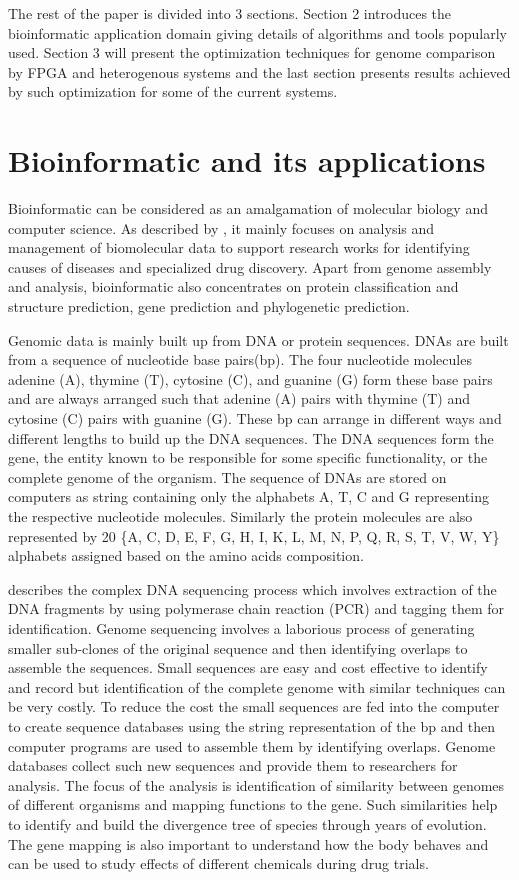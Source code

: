 \documentclass[12pt,twoside]{article}
\begin{document}
The rest of the paper is divided into 3 sections. Section 2 introduces the bioinformatic application domain giving
details of algorithms and tools popularly used. Section 3 will present the optimization techniques for genome
comparison by FPGA and heterogenous systems and the last section presents results achieved by such optimization
for some of the current systems.

\section {Bioinformatic and its applications}
\label{sec:bioapplications}
Bioinformatic can be considered as an amalgamation of molecular biology and computer science.
As described by \textcite[chapter 8]{gokhale_reconfigurable_2010}, it mainly focuses on analysis
and management of biomolecular data to support research works for identifying causes of diseases and
specialized drug discovery. Apart from genome assembly and analysis, bioinformatic also concentrates
on protein classification and structure prediction, gene prediction and phylogenetic prediction.

Genomic data is mainly built up from DNA or protein sequences. DNAs are built from a sequence of
nucleotide base pairs(bp). The four nucleotide molecules adenine (A), thymine (T), cytosine (C), and guanine (G)
form these base pairs and are always arranged such that adenine (A) pairs with thymine (T) and
cytosine (C) pairs with guanine (G). These bp can arrange in different ways and different lengths to build up the DNA
sequences. The DNA sequences form the gene, the entity known to be responsible for some specific functionality,
or the complete genome of the organism. The sequence of DNAs are stored on computers as string containing only the
alphabets A, T, C and G representing the respective nucleotide molecules. Similarly the protein molecules
are also represented by 20 \{A, C, D, E, F, G, H, I, K, L, M, N, P, Q, R, S, T, V, W, Y\} alphabets assigned
based on the amino acids composition.

\textcite[chapter 2]{mount_bioinformatics:_2004} describes the complex DNA sequencing process which involves
extraction of the DNA fragments by using polymerase chain reaction (PCR) and tagging them for identification.
Genome sequencing involves a laborious process of generating smaller sub-clones of the original sequence and
then identifying overlaps to assemble the sequences. Small sequences are easy and cost effective to identify
and record but identification of the complete genome with similar techniques can be very costly. To reduce
the cost the small sequences are fed into the computer to create sequence databases using the string
representation of the bp and then computer programs are used to assemble them by identifying overlaps.
Genome databases collect such new sequences and provide them to researchers for analysis. The focus
of the analysis is identification of similarity between genomes of different organisms and mapping
functions to the gene. Such similarities help to identify and build the divergence tree of species
through years of evolution. The gene mapping is also important to understand how the body behaves and can
be used to study effects of different chemicals during drug trials.
\end{document}
